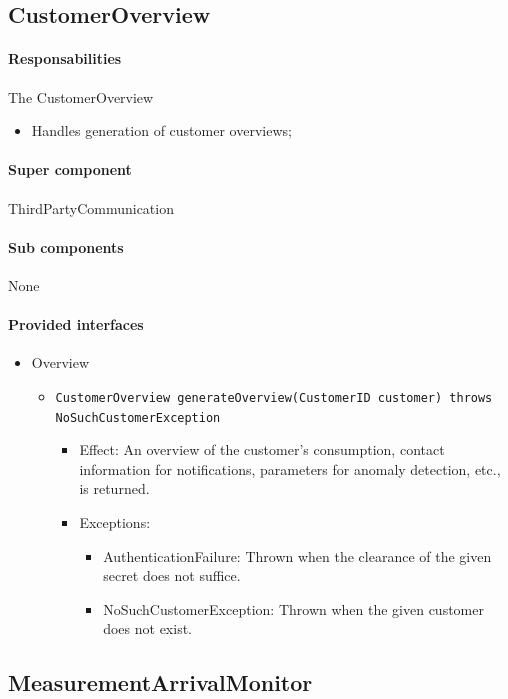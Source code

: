 \documentclass[a4paper,10pt]{article}
\begin{document}
\subsection{CustomerOverview}
\paragraph{Responsabilities} 
The CustomerOverview
\begin{itemize}
	\item Handles generation of customer overviews;
\end{itemize}

\paragraph{Super component} ThirdPartyCommunication

\paragraph{Sub components} None

\paragraph{Provided interfaces}
\begin{itemize}
	\item Overview
    \begin{itemize}
        \item \texttt{CustomerOverview generateOverview(CustomerID customer) throws NoSuchCustomerException}
        \begin{itemize}
        	\item Effect: An overview of the customer's consumption, contact information for notifications, parameters for anomaly detection, etc., is returned.
            \item Exceptions:
            \begin{itemize}
            	\item AuthenticationFailure: Thrown when the clearance of the given secret does not suffice.
            	\item NoSuchCustomerException: Thrown when the given customer does not exist.
            \end{itemize}
        \end{itemize}
    \end{itemize}
\end{itemize}

\subsection{MeasurementArrivalMonitor}
\end{document}
